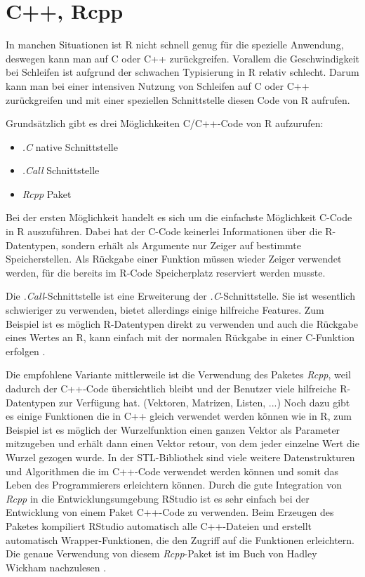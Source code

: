 \section{C++, Rcpp}
\label{sec:Rcpp}
In manchen Situationen ist R nicht schnell genug für die spezielle Anwendung, deswegen kann man auf C oder C++ zurückgreifen. Vorallem die Geschwindigkeit bei Schleifen ist aufgrund der schwachen Typisierung in R relativ schlecht. Darum kann man bei einer intensiven Nutzung von Schleifen auf C oder C++ zurückgreifen und mit einer speziellen Schnittstelle diesen Code von R aufrufen.

Grundsätzlich gibt es drei Möglichkeiten C/C++-Code von R aufzurufen:
\begin{itemize}
	\item \emph{.C} native Schnittstelle
	\item \emph{.Call} Schnittstelle
	\item \emph{Rcpp} Paket
\end{itemize}

Bei der ersten Möglichkeit handelt es sich um die einfachste Möglichkeit C-Code in R auszuführen. Dabei hat der C-Code keinerlei Informationen über die R-Datentypen, sondern erhält als Argumente nur Zeiger auf bestimmte Speicherstellen. Als Rückgabe einer Funktion müssen wieder Zeiger verwendet werden, für die bereits im R-Code Speicherplatz reserviert werden musste.

Die \emph{.Call}-Schnittstelle ist eine Erweiterung der \emph{.C}-Schnittstelle. Sie ist wesentlich schwieriger zu verwenden, bietet allerdings einige hilfreiche Features. Zum Beispiel ist es möglich R-Datentypen direkt zu verwenden und auch die Rückgabe eines Wertes an R, kann einfach mit der normalen Rückgabe in einer C-Funktion erfolgen \cite{wickham2015r}.

Die empfohlene Variante mittlerweile ist die Verwendung des Paketes \emph{Rcpp}, weil dadurch der C++-Code übersichtlich bleibt und der Benutzer viele hilfreiche R-Datentypen zur Verfügung hat. (Vektoren, Matrizen, Listen, ...) Noch dazu gibt es einige Funktionen die in C++ gleich verwendet werden können wie in R, zum Beispiel ist es möglich der Wurzelfunktion einen ganzen Vektor als Parameter mitzugeben und erhält dann einen Vektor retour, von dem jeder einzelne Wert die Wurzel gezogen wurde. In der STL-Bibliothek sind viele weitere Datenstrukturen und Algorithmen die im C++-Code verwendet werden können und somit das Leben des Programmierers erleichtern können. Durch die gute Integration von \emph{Rcpp} in die Entwicklungsumgebung RStudio ist es sehr einfach bei der Entwicklung von einem Paket C++-Code zu verwenden. Beim Erzeugen des Paketes kompiliert RStudio automatisch alle C++-Dateien und erstellt automatisch Wrapper-Funktionen, die den Zugriff auf die Funktionen erleichtern. Die genaue Verwendung von diesem \emph{Rcpp}-Paket ist im Buch von Hadley Wickham nachzulesen \cite{wickham2015advanced}. 

